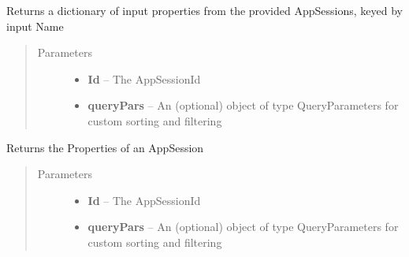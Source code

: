 \documentclass[letterpaper,10pt,english]{sphinxmanual}
\begin{document}
\begin{fulllineitems}
\begin{fulllineitems}
\begin{quote}
\begin{description}
\end{description}\end{quote}

\end{fulllineitems}


\begin{fulllineitems}
\label{Available modules:BaseSpacePy.api.BaseSpaceAPI.BaseSpaceAPI.getAppSessionInputsById}
Returns a dictionary of input properties from the provided AppSessions, keyed by input Name
\begin{quote}\begin{description}
\item[{Parameters}] \leavevmode\begin{itemize}
\item {} 
\textbf{Id} -- The AppSessionId

\item {} 
\textbf{queryPars} -- An (optional) object of type QueryParameters for custom sorting and filtering

\end{itemize}

\end{description}\end{quote}

\end{fulllineitems}


\begin{fulllineitems}
\label{Available modules:BaseSpacePy.api.BaseSpaceAPI.BaseSpaceAPI.getAppSessionPropertiesById}
Returns the Properties of an AppSession
\begin{quote}\begin{description}
\item[{Parameters}] \leavevmode\begin{itemize}
\item {} 
\textbf{Id} -- The AppSessionId

\item {} 
\textbf{queryPars} -- An (optional) object of type QueryParameters for custom sorting and filtering


\end{itemize}
\end{description}
\end{quote}
\end{fulllineitems}
\end{fulllineitems}
\end{document}
